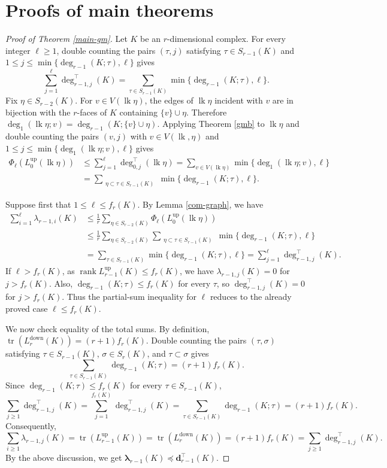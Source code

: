 \documentclass[12pt]{amsart}
\theoremstyle{plain}
\theoremstyle{definition}
\numberwithin{equation}{section}
\numberwithin{figure}{section}
\newcommand{\bflam}{\bm{\lambda}}
\newcommand{\dd}{\mathbf d}
\newcommand{\Ldown}{L^{\operatorname{down}}}
\newcommand{\Lup}{L^{\operatorname{up}}}
\newcommand{\lk}{\operatorname{lk}}
\newcommand{\pre}{\preccurlyeq}
\newcommand{\rank}{\operatorname{rank}}
\newcommand{\tr}{\operatorname{tr}}
\begin{document}
\section{Proofs of main theorems}\label{main-proof}
\begin{proof}[Proof of Theorem \ref{main-gm}]
Let $K$ be an $r$-dimensional complex.
For every integer $\ell\geq 1$, double counting the pairs $(\tau,j)$ satisfying $\tau\in S_{r-1}(K)$ and $1\leq j\leq\min\{\deg_{r-1}(K;\tau),\ell\}$ gives
\[
\sum_{j = 1}^{\ell} \deg^\top_{r - 1,j}(K)
=
\sum_{\tau \in S_{r - 1}(K)}
\min\{\deg_{r-1}(K;\tau),\ell\}.
\]
Fix $\eta \in S_{r-2}(K)$.
For $v \in V(\lk \eta)$, the edges of $\lk \eta$ incident with $v$ are in bijection with the $r$-faces of $K$ containing $\{v\} \cup \eta$.
Therefore $\deg_{1}(\lk \eta; v)=\deg_{r-1}(K;\{v\} \cup \eta)$.
Applying Theorem \ref{gmb} to $\lk \eta$ and double counting the pairs $(v,j)$ with $v \in V(\lk,\eta)$ and $1\leq j\leq\min\{\deg_{1}(\lk \eta;v),\ell\}$ gives
\[
\begin{split}
\Phi_\ell(\Lup_0(\lk \eta))
 & \leq
\sum_{j = 1}^{\ell}\deg^\top_{0,j}(\lk \eta)
=\sum_{v \in V(\lk \eta)} \min\{\deg_{1}(\lk \eta;v),\ell\}\\
&=\sum_{\substack{\eta \subset \tau \in S_{r - 1}(K) }}
\min\{\deg_{r - 1}(K;\tau),\ell\}.
\end{split}
\]

Suppose first that $1\leq\ell\leq f_r(K)$.
By Lemma \ref{com-graph}, we have
\[
\begin{aligned}
\sum_{i = 1}^{\ell} \lambda_{r-1,i}(K)
&\leq \frac{1}{r}
\sum_{\eta \in S_{r - 2}(K)}
\Phi_\ell(\Lup_0(\lk \eta)) \\
&\leq
\frac{1}{r}
\sum_{\eta \in S_{r - 2}(K)}
\sum_{\substack{\eta \subset \tau \in S_{r - 1}(K)}}
\min\{\deg_{r - 1}(K;\tau),\ell\} \\
&=
\sum_{\tau \in S_{r - 1}(K)}
\min\{\deg_{r - 1}(K;\tau),\ell\}
=
\sum_{j = 1}^{\ell} \deg^\top_{r - 1,j}(K).
\end{aligned}
\]
If $\ell>f_r(K)$, as $\rank\Lup_{r-1}(K)\leq f_r(K)$, we have  $\lambda_{r-1,j}(K)=0$ for $j>f_r(K)$.
Also, $\deg_{r-1}(K;\tau)\leq f_r(K)$ for every $\tau$, so $\deg^\top_{r-1,j}(K)=0$ for $j>f_r(K)$.
Thus the partial-sum inequality for $\ell$ reduces to the already proved case $\ell \le f_r(K)$.

We now check equality of the total sums.
By definition, $\tr (\Ldown_r(K))= (r + 1)f_r(K)$.
Double counting the pairs $(\tau,\sigma)$ satisfying $\tau \in S_{r - 1}(K)$, $\sigma \in S_r(K)$, and $\tau \subset \sigma$ gives
\[
\sum_{\tau \in S_{r - 1}(K)} \deg_{r-1}(K;\tau) = (r + 1)f_r(K).
\]
Since $\deg_{r-1}(K;\tau) \leq f_r(K)$ for every $\tau \in S_{r - 1}(K)$, 
$$\sum_{j \ge 1} \deg^\top_{r - 1,j}(K) = \sum_{j = 1}^{f_r(K)} \deg^\top_{r - 1,j}(K)
=
\sum_{\tau \in S_{r - 1}(K)}\deg_{r-1}(K;\tau)=(r + 1)f_r(K).$$
Consequently,
\[
\sum_{i \geq 1} \lambda_{r-1,j}(K)
= \tr\left(\Lup_{r - 1}(K)\right)
= \tr(\Ldown_r(K))
= (r + 1)f_r(K) = \sum_{j \geq 1} \deg^\top_{r - 1,j}(K).
\]
By the above discussion, we get $\bflam_{r - 1}(K) \pre \dd_{r - 1}^\top(K)$.
\end{proof}
\end{document}

